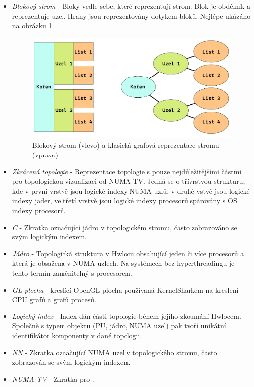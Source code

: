 \begin{itemize}
    \item \emph{Blokový strom} - Bloky vedle sebe, které reprezentují strom. Blok je obdélník a reprezentuje uzel. Hrany jsou reprezentovány dotykem bloků. Nejlépe ukázáno na obrázku \ref{block-tree}.
    \begin{figure}[p]\centering
        \includegraphics[width=140mm]{img/NUMATV/block-tree.pdf}
        \caption{Blokový strom (vlevo) a klasická grafová reprezentace stromu (vpravo)}
        \label{block-tree}
    \end{figure}
    \item \emph{Zkrácená topologie} - Reprezentace topologie s pouze nejdůležitějšími částmi pro topologickou vizualizaci od NUMA TV. Jedná se o třívrstvou strukturu, kde v první vrstvě jsou logické indexy NUMA uzlů, v druhé vstvě jsou logické indexy jader, ve třetí vrstvě jsou logické indexy procesorů spárovány s OS indexy procesorů.
    \item \emph{C} - Zkratka označující jádro v topologickém stromu, často zobrazováno se svým logickým indexem.
    \item \emph{Jádro} - Topologická struktura v Hwlocu obsahující jeden či více procesorů a která je obsažena v NUMA uzlech. Na systémech bez hyperthreadingu je tento termín zaměnitelný s procesorem.
    \item \emph{GL plocha} - kreslící OpenGL plocha používaná KernelSharkem na kreslení CPU grafů a grafů procesů.
    \item \emph{Logický index} - Index dán části topologie během jejího zkoumání Hwlocem. Společně s typem objektu (PU, jádro, NUMA uzel) pak tvoří unikátní identifikátor komponenty v dané topologii.
    \item \emph{NN} - Zkratka označující NUMA uzel v topologického stromu, často zobrazován se svým logickým indexem.
    \item \emph{NUMA TV} - Zkratka pro .

\end{itemize}
